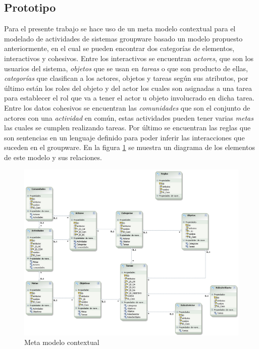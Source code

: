 \subsection{Prototipo}
Para el presente trabajo se hace uso de un meta modelo contextual para el modelado de actividades de sistemas groupware basado un modelo propuesto anteriormente\cite{montane2013context}, en el cual se pueden encontrar dos categor\'ias de elementos, interactivos y cohesivos.  Entre los interactivos se encuentran \textit{actores}, que son los usuarios del sistema, \textit{objetos} que se usan en \textit{tareas} o que son producto de ellas, \textit{categor\'ias} que clasifican a los actores, objetos y tareas seg\'un sus atributos, por \'ultimo est\'an los roles del objeto y del actor los cuales son asignadas a una tarea para establecer el rol que va a tener el actor u objeto involucrado en dicha tarea. Entre los datos cohesivos se encuentran las \textit{comunidades} que son el conjunto de actores con una \textit{actividad} en com\'un, estas actividades pueden tener varias \textit{metas} las cuales se cumplen realizando tareas. Por \'ultimo se encuentran las reglas que son sentencias en un lenguaje definido para poder inferir las interacciones que suceden en el groupware. En la figura \ref{cmp:mmc} se muestra un diagrama de los elementos de este modelo y sus relaciones.

\begin{figure}[h!]
  \centering
    \includegraphics[scale=0.35]{images/modelo}
  \caption{Meta modelo contextual}
  \label{cmp:mmc}
\end{figure}

